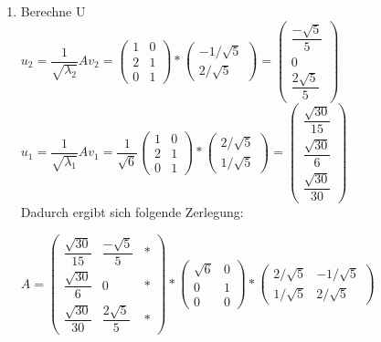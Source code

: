 \documentclass[10pt,a4paper]{article}
\begin{document}
\begin{enumerate}
    \item Berechne U\\
    $u_2 = \dfrac{1}{\sqrt{\lambda_2}}Av_2 = \begin{pmatrix}
        1 & 0\\
        2 & 1\\
        0 & 1
    \end{pmatrix} * \begin{pmatrix}
        -1/\sqrt{5}\\
        2/\sqrt{5}
    \end{pmatrix} =
    \begin{pmatrix}
        \dfrac{-\sqrt{5}}{5}\\
        0\\
        \dfrac{2\sqrt{5}}{5}
    \end{pmatrix}$\\
    $u_1 = \dfrac{1}{\sqrt{\lambda_1}}Av_1 = \dfrac{1}{\sqrt{6}} \begin{pmatrix}
        1 & 0\\
        2 & 1\\
        0 & 1
    \end{pmatrix} * \begin{pmatrix}
        2/\sqrt{5}\\
        1/\sqrt{5}
    \end{pmatrix} =
    \begin{pmatrix}
        \dfrac{\sqrt{30}}{15}\\
        \dfrac{\sqrt{30}}{6}\\
        \dfrac{\sqrt{30}}{30}
    \end{pmatrix}$\\

    Dadurch ergibt sich folgende Zerlegung:

    $A =     \begin{pmatrix}
        \dfrac{\sqrt{30}}{15} & \dfrac{-\sqrt{5}}{5} & *\\
        \dfrac{\sqrt{30}}{6}  & 0 & *\\ 
        \dfrac{\sqrt{30}}{30} & \dfrac{2\sqrt{5}}{5} & *
    \end{pmatrix} * \begin{pmatrix}
        \sqrt{6} & 0\\
       0  & 1 \\ 
        0 & 0
    \end{pmatrix} * \begin{pmatrix}
        2/\sqrt{5} & -1/\sqrt{5}\\
        1/\sqrt{5}  & 2/\sqrt{5}
    \end{pmatrix} $
    

\end{enumerate}
\end{document}
